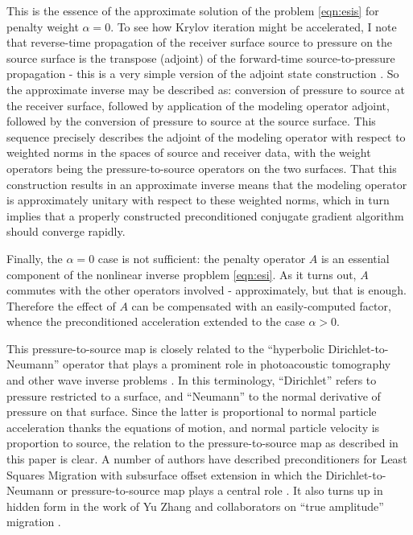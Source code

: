 \documentclass[12pt]{geophysics}
\begin{document}
This is the essence of the approximate solution of the problem
\ref{eqn:esis} for penalty weight $\alpha=0$. To see how Krylov
iteration might be accelerated, I note that reverse-time propagation of
the receiver surface source to pressure on the source surface is the transpose (adjoint) of the
forward-time source-to-pressure propagation - this is a very simple
version of the adjoint state construction \cite[]{Plessix:06}. So the
approximate inverse may be described as: conversion of pressure to source at the
receiver surface, followed by application of the modeling operator adjoint,
followed by the conversion of pressure to source at the source
surface. This sequence precisely describes the adjoint of the modeling
operator with respect to weighted norms in the spaces of source and
receiver data, with the weight operators being the
pressure-to-source operators on the two surfaces. That this construction results in an
approximate inverse means that the modeling operator is approximately
unitary with respect to these weighted norms, which in turn implies
that a properly constructed preconditioned conjugate gradient algorithm should converge
rapidly.

Finally, the $\alpha=0$ case is not sufficient: the penalty operator
$A$ is an essential component of the nonlinear inverse propblem
\ref{eqn:esi}. As it turns out, $A$ commutes with the other operators
involved - approximately, but that is enough. Therefore the effect of
$A$ can be compensated with an easily-computed factor, whence the
preconditioned acceleration extended to the case $\alpha > 0$. 

This pressure-to-source map is closely related to the ``hyperbolic
Dirichlet-to-Neumann'' operator that plays a prominent role in
photoacoustic tomography and other wave inverse problems
\cite[]{Rachele:00,StefUhl:05}. In this terminology, ``Dirichlet''
refers to pressure restricted to a surface, and ``Neumann'' to the
normal derivative of pressure on that surface. Since the latter is
proportional to normal particle acceleration thanks the equations of motion,
and normal particle velocity is proportion to source, the relation to the
pressure-to-source map as described in this paper is clear. A number
of authors have described preconditioners for Least Squares Migration
with subsurface offset extension in which the Dirichlet-to-Neumann or
pressure-to-source map plays a central role
\cite[]{tenKroode:12,HouSymes:15,Herve2017}. It also turns up in hidden
form in the work of Yu Zhang and collaborators on ``true amplitude''
migration
\cite[]{YuZhang:14,TangXuZhang:13,XuWang:2012,XuZhangTang:11,Zhang:SEG09}.
\end{document}
